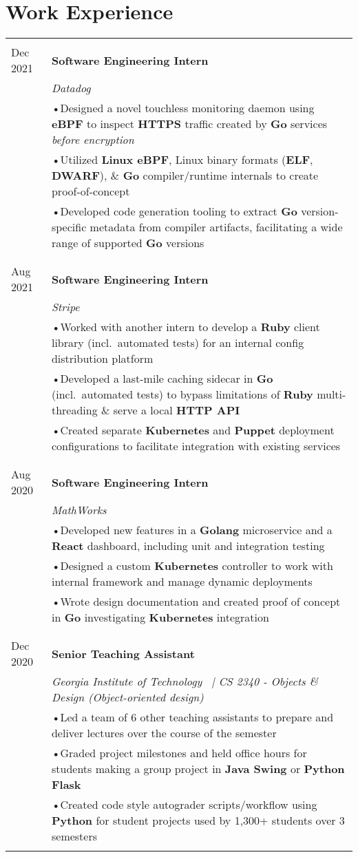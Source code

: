 \documentclass[a4paper,11pt]{article}
\newenvironment{rsection}[1]
  {
    \section{#1}
    \begin{tabular}{>{\raggedleft\arraybackslash}p{\lcolwidth}|p{\rcolwidth}}
   } {
    \\\multicolumn{2}{c}{} \\[-10pt]
    \end{tabular}
  }
\newcommand{\rheader}[2]{
    \multirow[t]{2}{*}{
        \begin{minipage}[t]{\dimexpr \lcolwidth - 0.1cm}
            \begin{flushright}
                \textsc{#1}
            \end{flushright}
        \end{minipage}
    } & \textbf{#2}
}
\newcommand{\rdesc}[1]{
  \\[-2pt]&\small{\emph{#1}\vspace{1pt} }
}
\newcommand{\ritem}[2][ •\hspace{3pt}]{\\[-2pt]& \footnotesize{#1#2}}
\newcommand{\rskip}{\\\multicolumn{2}{c}{} \\[\subsectionvspace]}
\begin{document}
\begin{rsection}{Work Experience}
  \rheader{Aug 2021 -\\[-1pt] Dec 2021}{Software Engineering Intern}
  \rdesc{Datadog}
  \ritem{Designed a novel touchless monitoring daemon using \textbf{eBPF}
    to inspect \textbf{HTTPS} traffic created by \textbf{Go} services \textit{before encryption}}
  \ritem{Utilized \textbf{Linux eBPF}, Linux binary formats (\textbf{ELF}, \textbf{DWARF}),
    \& \textbf{Go} compiler/runtime internals to create proof-of-concept}
  \ritem{Developed code generation tooling to extract \textbf{Go} version-specific
    metadata from compiler artifacts, facilitating a wide range of supported \textbf{Go} versions}
  \rskip

  \rheader{May 2021 -\\[-1pt] Aug 2021}{Software Engineering Intern}
  \rdesc{Stripe}
  \ritem{Worked with another intern to develop a \textbf{Ruby} client library (incl.\ automated tests)
    for an internal config distribution platform}
  \ritem{Developed a last-mile caching sidecar in \textbf{Go} (incl.\ automated tests) to
    bypass limitations of \textbf{Ruby} multi-threading \& serve a local \textbf{HTTP API}}
  \ritem{Created separate \textbf{Kubernetes} and \textbf{Puppet} deployment
    configurations to facilitate integration with existing services}
  \rskip

  \rheader{May 2020 -\\[-1pt] Aug 2020}{Software Engineering Intern}
  \rdesc{MathWorks}
  \ritem{Developed new features in a \textbf{Golang} microservice
    and a \textbf{React} dashboard, including unit and integration testing}
  \ritem{Designed a custom \textbf{Kubernetes} controller
    to work with internal framework and manage dynamic deployments}
  \ritem{Wrote design documentation and created proof of concept
    in \textbf{Go} investigating \textbf{Kubernetes} integration}
  \rskip

  \rheader{Aug 2019 -\\[-1pt] Dec 2020}{Senior Teaching Assistant}
  \rdesc{Georgia Institute of Technology \ {\normalfont |}\hspace{2pt}
    CS 2340 - Objects \& Design (Object-oriented design)}
  \ritem{Led a team of 6 other teaching assistants to prepare and deliver lectures
    over the course of the semester}
  \ritem{Graded project milestones and held office hours for students
    making a group project in \textbf{Java Swing} or \textbf{Python Flask}}
  \ritem{Created code style autograder scripts/workflow using \textbf{Python}
    for student projects used by 1,300+ students over 3 semesters}
\end{rsection}
\vspace{\sectionvspace}
\end{document}
